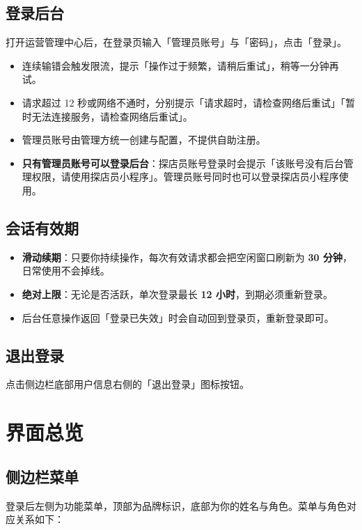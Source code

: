 \documentclass[12pt,a4paper,fontset=none]{ctexart}
\begin{document}
\subsection{登录后台}
打开运营管理中心后，在登录页输入「管理员账号」与「密码」，点击「登录」。


\begin{itemize}
\item 连续输错会触发限流，提示「操作过于频繁，请稍后重试」，稍等一分钟再试。
\item 请求超过 12 秒或网络不通时，分别提示「请求超时，请检查网络后重试」「暂时无法连接服务，请检查网络后重试」。
\item 管理员账号由管理方统一创建与配置，不提供自助注册。
\item \textbf{只有管理员账号可以登录后台}：探店员账号登录时会提示「该账号没有后台管理权限，请使用探店员小程序」。管理员账号同时也可以登录探店员小程序使用。
\end{itemize}

\subsection{会话有效期}
\begin{itemize}
\item \textbf{滑动续期}：只要你持续操作，每次有效请求都会把空闲窗口刷新为 \textbf{30 分钟}，日常使用不会掉线。
\item \textbf{绝对上限}：无论是否活跃，单次登录最长 \textbf{12 小时}，到期必须重新登录。
\item 后台任意操作返回「登录已失效」时会自动回到登录页，重新登录即可。
\end{itemize}

\subsection{退出登录}
点击侧边栏底部用户信息右侧的「退出登录」图标按钮。

\section{界面总览}

\subsection{侧边栏菜单}
登录后左侧为功能菜单，顶部为品牌标识，底部为你的姓名与角色。菜单与角色对应关系如下：
\end{document}
